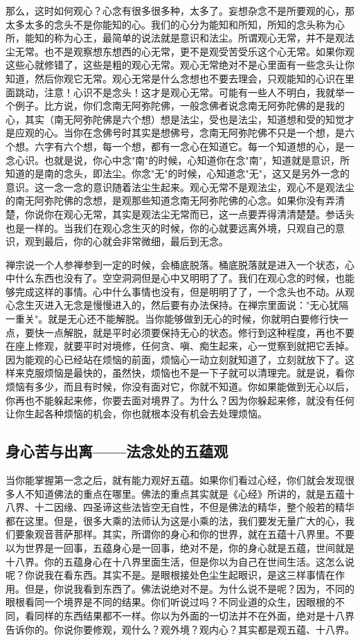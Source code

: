 \documentclass{book}
\begin{document}
那么，这时如何观心？心念有很多很多种，太多了。妄想杂念不是所要观的心，那太多太多的念头不是你能知的心。我们的心分为能知和所知，所知的念头称为心所，能知的称为心王，最简单的说法就是意识和法尘。所谓观心无常，并不是观法尘无常。也不是观察想东想西的心无常，更不是观受苦受乐这个心无常。如果你观这些心就修错了，这些是粗的观心无常。观心无常绝对不是心里面有一些念头让你知道，然后你观它无常。观心无常是什么念想也不要去理会，只观能知的心识在里面跳动，注意！心识不是念头！这才是观心无常。可能有一些人不明白，我就举一个例子。比方说，你们念南无阿弥陀佛，一般念佛者说念南无阿弥陀佛的是我的心，其实（南无阿弥陀佛是六个想）想是法尘，受也是法尘，知道想和受的知觉才是应观的心。当你在念佛号时其实是想佛号，念南无阿弥陀佛不只是一个想，是六个想。六字有六个想，每一个想，都有一念心在知道它。每一个知道想的心，是一念心识。也就是说，你心中念"南"的时候，心知道你在念"南"，知道就是意识，所知道的是南的念头，即法尘。你念"无"的时候，心知道念"无"，这又是另外一念的意识。这一念一念的意识随着法尘生起来。观心无常不是观法尘，观心不是观法尘的南无阿弥陀佛的念想，是观那些知道念南无阿弥陀佛的心念。如果你没有弄清楚，你说你在观心无常，其实是观法尘无常而已，这一点要弄得清清楚楚。参话头也是一样的。当我们在观心念生灭的时候，你的心就要远离外境，只观自己的意识，观到最后，你的心就会非常微细，最后到无念。

禅宗说一个人参禅参到一定的时候，会桶底脱落。桶底脱落就是进入一个状态，心中什么东西也没有了。空空洞洞但是心中又明明了了。我们在观心念的时候，也能够完成这样的事情。心中什么事情也没有，但是明明了了，一个念头也不动。从观心念生灭进入无念是慢慢进入的，然后要有办法保持。在禅宗里面说："无心犹隔一重关"。就是无心还不能解脱。当你能够做到无心的时候，你就明白要修行快一点，要快一点解脱，就是平时必须要保持无心的状态。修行到这种程度，再也不要在座上修观，就要平时对境修，任何贪、嗔、痴生起来，心一觉察到就把它丢掉。因为能观的心已经站在烦恼的前面，烦恼心一动立刻就知道了，立刻就放下了。这样来克服烦恼是最快的，虽然快，烦恼也不是一下子就可以清理完。就是说，看你烦恼有多少，而且有时候，你没有面对它，你就不知道。你如果能做到无心以后，你再也不能躲起来修，你要去面对境界了。为什么？因为你躲起来修，就没有任何让你生起各种烦恼的机会，你也就根本没有机会去处理烦恼。

\subsection{身心苦与出离——法念处的五蕴观}

当你能掌握第一念之后，就有能力观好五蕴。如果你们看过心经，你们就会发现很多人不知道佛法的重点在哪里。佛法的重点其实就是《心经》所讲的，就是五蕴十八界、十二因缘、四圣谛这些法皆空无自性，不但是佛法的精华，整个般若的精华都在这里。但是，很多大乘的法师认为这是小乘的法，我们要发无量广大的心，我们要象观音菩萨那样。其实，所谓你的身心和你的世界，就在五蕴十八界里。不要以为世界是一回事，五蕴身心是一回事，绝对不是，你的身心就是五蕴，世间就是十八界。你的五蕴身心在十八界里面生活，但是你以为自己在世间生活。这怎么说呢？你说我在看东西。其实不是。是眼根接处色尘生起眼识，是这三样事情在作用。但是，你说我看到东西了。佛法说绝对不是。为什么说不是呢？因为，不同的眼根看同一个境界是不同的结果。你们听说过吗？不同业道的众生，因眼根的不同，看同样的东西结果都不一样。你以为外面的一切法并不在外面，绝对是十八界告诉你的。你说你要修观，观什么？观外境？观内心？其实都是观五蕴、十八界。
\end{document}
